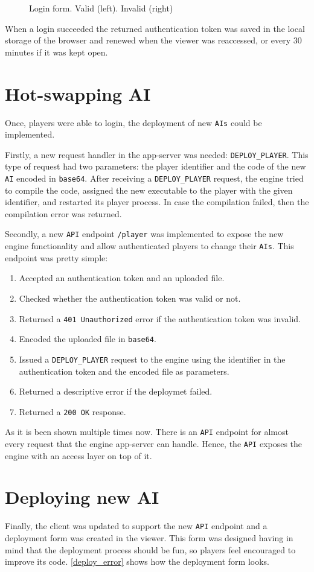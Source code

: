 \documentclass[a4paper,11pt,titlepage,abstract,numbers=noenddot,automark,mnsy,intlimits,rgb,dvipsnames]{report}
\begin{document}
\begin{figure}[H]
{{}
}
\caption{Login form. Valid (left). Invalid (right)}
\label{login_form}
\end{figure}
When a login succeeded the returned authentication token was saved in the local storage of the browser and renewed
when the viewer was reaccessed, or every 30 minutes if it was kept open.
\section{Hot-swapping AI}
Once, players were able to login, the deployment of new \texttt{AIs} could be implemented.

Firstly, a new request handler in the app-server was needed: \texttt{DEPLOY\_PLAYER}. This type of request had two
parameters: the player identifier and the code of the new \texttt{AI} encoded in \texttt{base64}. After receiving a \texttt{DEPLOY\_PLAYER}
request, the engine tried to compile the code, assigned the new executable to the player with the given identifier,
and restarted its player process. In case the compilation failed, then the compilation error was returned.

Secondly, a new \texttt{API} endpoint \texttt{/player} was implemented to expose the new engine functionality and
allow authenticated players to change their \texttt{AIs}. This endpoint was pretty simple:
\begin{enumerate}
\item
Accepted an authentication token and an uploaded file.
\item
Checked whether the authentication token was valid or not.
\item
Returned a \texttt{401 Unauthorized} error if the authentication token was invalid.
\item
Encoded the uploaded file in \texttt{base64}.
\item
Issued a \texttt{DEPLOY\_PLAYER} request to the engine using the identifier in the authentication token and the
  encoded file as parameters.
\item
Returned a descriptive error if the deploymet failed.
\item
Returned a \texttt{200 OK} response.
\end{enumerate}
As it is been shown multiple times now. There is an \texttt{API} endpoint for almost every request that the engine app-server
can handle. Hence, the \texttt{API} exposes the engine with an access layer on top of it.
\section{Deploying new AI}
Finally, the client was updated to support the new \texttt{API} endpoint and a deployment form was created in the viewer.
This form was designed having in mind that the deployment process should be fun, so players feel encouraged to
improve its code. \autoref{deploy_error} shows how the deployment form looks.
\end{document}
